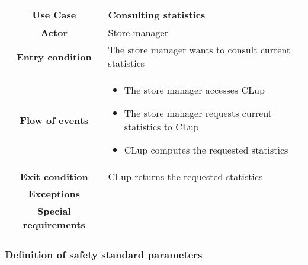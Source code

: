 \documentclass[../../main.tex]{subfiles}
\begin{document}
      \begin{table}[H]
        \centering
          \begin{tabular}{c m{}}
          \hline
          \textbf{Use Case} & Consulting statistics\\ \hline
          \textbf{Actor} & Store manager\\ \hline
          \textbf{Entry condition} & The store manager wants to consult current statistics\\  \hline
          \textbf{Flow of events} & \begin{itemize}
                                      \item The store manager accesses CLup
                                      \item The store manager requests current statistics to CLup
                                      \item CLup computes the requested statistics
                                    \end{itemize}\\ \hline
          \textbf{Exit condition} & CLup returns the requested statistics \\ \hline
          \textbf{Exceptions} & \\ \hline
          \textbf{Special requirements} &\\ \hline
          \end{tabular}
      \end{table}


      \subsubsection{Definition of safety standard parameters}
\end{document}
